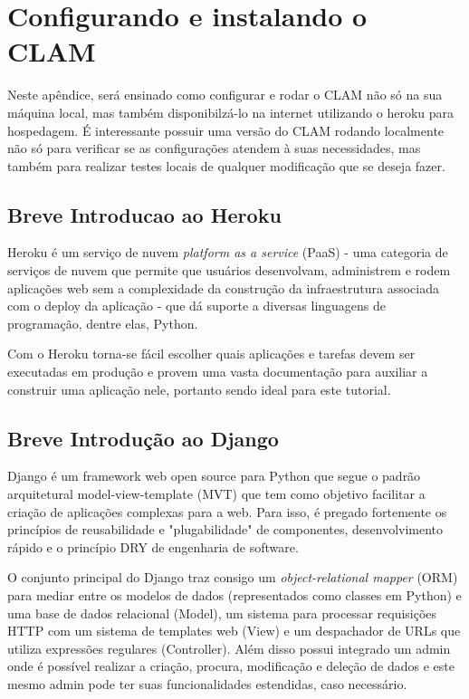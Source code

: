 \chapter{Configurando e instalando o CLAM}
\label{chap:clam}

Neste apêndice, será ensinado como configurar e rodar o CLAM não só na sua máquina
local, mas também disponibilzá-lo na internet utilizando o heroku para hospedagem.
É interessante possuir uma versão do CLAM rodando localmente não só para verificar
se as configurações atendem à suas necessidades, mas também para realizar testes locais
de qualquer modificação que se deseja fazer.

\section{Breve Introducao ao Heroku}

Heroku é um serviço de nuvem \textit{platform as a service} (PaaS) -  uma categoria de serviços de
nuvem que permite que usuários desenvolvam, administrem e rodem aplicações web sem a complexidade
da construção da infraestrutura associada com o deploy da aplicação -  que dá suporte a diversas
linguagens de programação, dentre elas, Python.

Com o Heroku torna-se fácil escolher quais aplicações e tarefas devem ser executadas em produção e
provem uma vasta documentação para auxiliar a construir uma aplicação nele, portanto sendo ideal
para este tutorial.

\section{Breve Introdução ao Django}

Django é um framework web open source para Python que segue o padrão arquitetural model-view-template
(MVT) que tem como objetivo facilitar a criação de aplicações complexas para a web. Para isso, é 
pregado fortemente os princípios de reusabilidade e "plugabilidade" de componentes, desenvolvimento
rápido e o princípio DRY de engenharia de software.

O conjunto principal do Django traz consigo um \textit{object-relational mapper} (ORM) para mediar
entre os modelos de dados (representados como classes em Python) e uma base de dados relacional 
(Model), um sistema para processar requisições HTTP com um sistema de templates web (View) e um
despachador de URLs que utiliza expressões regulares (Controller). Além disso possui integrado
um admin onde é possível realizar a criação, procura, modificação e deleção de dados e este mesmo
admin pode ter suas funcionalidades estendidas, caso necessário.

